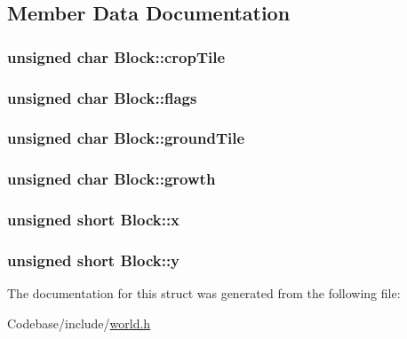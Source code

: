 \subsection{Member Data Documentation}
\hypertarget{struct_block_a7b78a9d429e2cc849e2c48e0bd99206e}{
\subsubsection[{crop\-Tile}]{\setlength{\rightskip}{0pt plus 5cm}unsigned char {\bf Block\-::crop\-Tile}}}\label{struct_block_a7b78a9d429e2cc849e2c48e0bd99206e}
\hypertarget{struct_block_abe93c385392d2a1c5476b27377aa2e65}{
\subsubsection[{flags}]{\setlength{\rightskip}{0pt plus 5cm}unsigned char {\bf Block\-::flags}}}\label{struct_block_abe93c385392d2a1c5476b27377aa2e65}
\hypertarget{struct_block_a11fd4d71b43ede889013402709fbc1d0}{
\subsubsection[{ground\-Tile}]{\setlength{\rightskip}{0pt plus 5cm}unsigned char {\bf Block\-::ground\-Tile}}}\label{struct_block_a11fd4d71b43ede889013402709fbc1d0}
\hypertarget{struct_block_a24f37e79d1ed8f7fa0e695ebfb098386}{
\subsubsection[{growth}]{\setlength{\rightskip}{0pt plus 5cm}unsigned char {\bf Block\-::growth}}}\label{struct_block_a24f37e79d1ed8f7fa0e695ebfb098386}
\hypertarget{struct_block_a7373a8e929823422dfcd4985a154d445}{
\subsubsection[{x}]{\setlength{\rightskip}{0pt plus 5cm}unsigned short {\bf Block\-::x}}}\label{struct_block_a7373a8e929823422dfcd4985a154d445}
\hypertarget{struct_block_af3d51fac75e91ac5ebf82acba62b5c1d}{
\subsubsection[{y}]{\setlength{\rightskip}{0pt plus 5cm}unsigned short {\bf Block\-::y}}}\label{struct_block_af3d51fac75e91ac5ebf82acba62b5c1d}


The documentation for this struct was generated from the following file\-:\begin{DoxyCompactItemize}
\item 
Codebase/include/\hyperlink{world_8h}{world.\-h}\end{DoxyCompactItemize}
